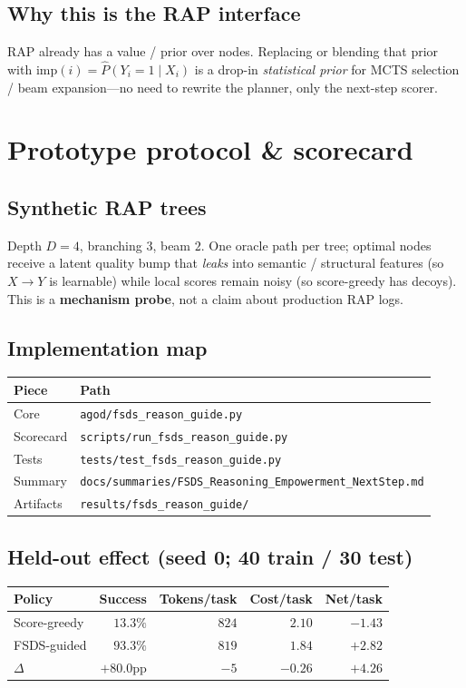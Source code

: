 \documentclass[11pt]{article}
\newcommand{\imp}{\mathrm{imp}}
\begin{document}
\subsection{Why this is the RAP interface}
RAP already has a value / prior over nodes. Replacing or blending that
prior with $\imp(i)=\widehat{P}(Y_i{=}1\mid X_i)$ is a drop-in
\emph{statistical prior} for MCTS selection / beam expansion---no need
to rewrite the planner, only the next-step scorer.

\section{Prototype protocol \& scorecard}
\label{sec:proto}

\subsection{Synthetic RAP trees}
Depth $D{=}4$, branching $3$, beam $2$. One oracle path per tree; optimal
nodes receive a latent quality bump that \emph{leaks} into semantic /
structural features (so $X\!\to\!Y$ is learnable) while local scores remain
noisy (so score-greedy has decoys). This is a \textbf{mechanism probe},
not a claim about production RAP logs.

\subsection{Implementation map}
\begin{center}
\begin{tabular}{@{}ll@{}}
\toprule
Piece & Path \\
\midrule
Core & \texttt{agod/fsds\_reason\_guide.py} \\
Scorecard & \texttt{scripts/run\_fsds\_reason\_guide.py} \\
Tests & \texttt{tests/test\_fsds\_reason\_guide.py} \\
Summary & \texttt{docs/summaries/FSDS\_Reasoning\_Empowerment\_NextStep.md} \\
Artifacts & \texttt{results/fsds\_reason\_guide/} \\
\bottomrule
\end{tabular}
\end{center}

\subsection{Held-out effect (seed 0; 40 train / 30 test)}
\begin{center}
\begin{tabular}{@{}lrrrr@{}}
\toprule
Policy & Success & Tokens/task & Cost/task & Net/task \\
\midrule
Score-greedy & $13.3\%$ & $824$ & $2.10$ & $-1.43$ \\
FSDS-guided & $\mathbf{93.3\%}$ & $819$ & $1.84$ & $\mathbf{+2.82}$ \\
$\Delta$ & $\mathbf{+80.0}$pp & $-5$ & $-0.26$ & $\mathbf{+4.26}$ \\
\bottomrule
\end{tabular}
\end{center}
\end{document}
